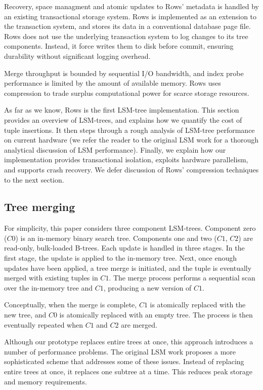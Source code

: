 \documentclass{sig-alternate-sigmod08}
\newcommand{\rows}{Rows\xspace}
\newcommand{\rowss}{Rows'\xspace}
\begin{document}
Recovery, space managment and atomic updates to \rowss metadata is
handled by an existing transactional storage system.  \rows is
implemented as an extension to the transaction system, and stores its
data in a conventional database page file.  \rows does not use the
underlying transaction system to log changes to its tree components.
Instead, it force writes them to disk before commit, ensuring
durability without significant logging overhead.

Merge throughput is bounded by sequential I/O bandwidth, and index
probe performance is limited by the amount of available memory.  \rows
uses compression to trade surplus computational power for scarce
storage resources.

As far as we know, \rows is the first LSM-tree implementation.  This
section provides an overview of LSM-trees, and explains how we
quantify the cost of tuple insertions.  It then steps through a rough
analysis of LSM-tree performance on current hardware (we refer the
reader to the original LSM work for a thorough analytical discussion
of LSM performance).  Finally, we explain how our implementation
provides transactional isolation, exploits hardware parallelism, and
supports crash recovery.  We defer discussion of \rowss compression
techniques to the next section.

\subsection{Tree merging}


For simplicity,
this paper considers three component LSM-trees.  Component zero ($C0$)
is an in-memory binary search tree.  Components one and two ($C1$,
$C2$) are read-only, bulk-loaded B-trees.  
Each update is handled in three stages.  In the first stage, the
update is applied to the in-memory tree.  Next, once enough updates
have been applied, a tree merge is initiated, and the tuple is
eventually merged with existing tuples in $C1$.  The merge process
performs a sequential scan over the in-memory tree and $C1$, producing
a new version of $C1$.

Conceptually, when the merge is complete, $C1$ is atomically replaced
with the new tree, and $C0$ is atomically replaced with an empty tree.
The process is then eventually repeated when $C1$ and $C2$ are merged.

Although our prototype replaces entire trees at once, this approach
introduces a number of performance problems.  The original LSM work
proposes a more sophisticated scheme that addresses some of these
issues.  Instead of replacing entire trees at once, it replaces one
subtree at a time.  This reduces peak storage and memory requirements.
\end{document}
